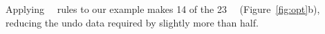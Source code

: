 Applying \nrb\ \patch\ rules to our example makes 14 of the 23 \patches\ \nrb\
(Figure~\ref{fig:opt}b),
%
reducing the undo data required by slightly more than half.


\begin{comment}
%
To avoid this overhead, \Kudos\ identifies \patches\ that will never
need to be reverted and omits their undo data. We call these \emph{\nrb}
\patches. (The opposite naturally being a \emph{\rb} \patch, when
necessary to differentiate them.)
%
Since a \nrb\ \patch\ cannot be reverted, a write of any \patches\
on block $B$ must include all \nrb\ \patches\ on $B$. To accordingly
update our formal model we define a new set of \patches, \PHard, which
contains all \nrb\ \patches. We write \PHard[B] to restrict the set
to block $B$\todo{Introduce \PSoft\ and \PSoft[B].}:

\begin{tabbing}
\textbf{Write block.} \\
\quad Pick some block $b$ with $\PMem[b] \neq \emptyset$. \\
\quad Pick some $P \subseteq \PMem[b]$ with $\PDepset{P} \subseteq P \cup
\PDisk$ and $\PHard[B] \subseteq P$. \\
\quad Move each $p \in P$ to $\PInf$ (in-flight). \\
\quad For each $p \in \PMem[b]-P$, set $\PDDepset{p} \gets \PDDepset{p}
\cup P$.
\end{tabbing}

\paragraph{}
To avoid (expensive) dependency traversals to determine whether a new
\patch\ will need to be reverted,
%
\Kudos\ conservatively identifies \nrb\ \patches\ using only local
dependency information.
%
\Kudos\ detects that a new \patch\ on block $b$ may need to be reverted if:
\todo{Which form is easier to read? Can we write \(\PMem - \PMem[b] - \PEmpty\) more concisely?}
%
\todo{Actually, our implementation also uses in flight \patches. Can we make
it not?}
%
\[ \PRDepset{\PMem[b]} \cap (\PMem - \PMem[b] - \PEmpty) \ne \emptyset \]
\[ \exists \inset{p}{\PMem[b]}\!:\
   \exists c\!:\ \exists \inset{q}{\PMem[c]}\!:\
   \indirdepends{q}{p} \]
%
This is both a safe and useful indicator because
%
the presence of an external \after\ is a necessary condition for a new
\patch's \before\ to induce a block-level cycle
%
and many blocks have no \patches\ with external \afters\ (e.g. most
file data blocks).


\end{comment}
